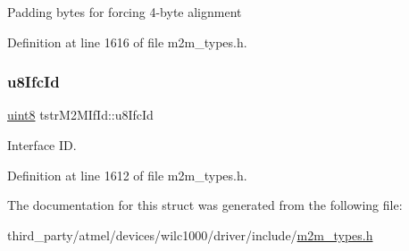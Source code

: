 Padding bytes for forcing 4-\/byte alignment 

Definition at line 1616 of file m2m\+\_\+types.\+h.

\mbox{\label{structtstrM2MIfId_a23f316aab7ec1b30d7830e063cc4d149}} 
\subsubsection{\texorpdfstring{u8\+Ifc\+Id}{u8IfcId}}
{\footnotesize\ttfamily \hyperlink{group__DataT_ga4df709a77647e870bbf1d955b8edc9a6}{uint8} tstr\+M2\+M\+If\+Id\+::u8\+Ifc\+Id}

Interface ID. 

Definition at line 1612 of file m2m\+\_\+types.\+h.



The documentation for this struct was generated from the following file\+:\begin{DoxyCompactItemize}
\item 
third\+\_\+party/atmel/devices/wilc1000/driver/include/\hyperlink{m2m__types_8h}{m2m\+\_\+types.\+h}\end{DoxyCompactItemize}

